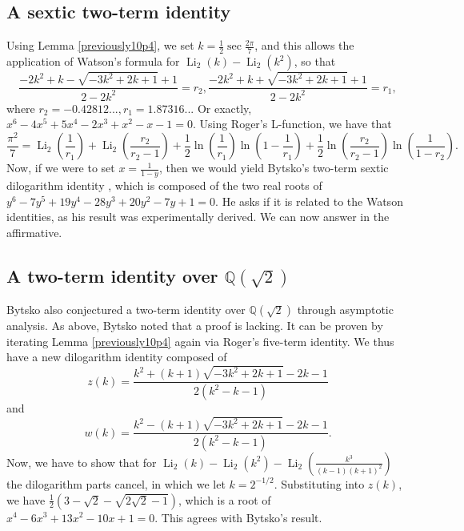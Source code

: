 \documentclass[12pt]{article}
\begin{document}
\subsection{A sextic two-term identity}
 Using Lemma \ref{previously10p4}, we set $k=\frac{1}{2}\sec \frac{2\pi}{7}$, and this allows the application of Watson's formula 
 for $\operatorname{Li}_2(k) - \operatorname{Li}_2(k^2)$, so that 
\begin{equation*}
 \frac{-2k^2 + k - \sqrt{-3k^2 + 2k + 1} + 1}{2 - 2k^2}=r_2, \frac{-2k^2 + k + \sqrt{-3k^2 + 2k + 1} + 1}{2 - 2k^2}=r_1, 
\end{equation*}
 where $r_2 = -0.42812..., r_1=1.87316...$ Or exactly, $x^6 - 4 x^5 + 5 x^4 - 2 x^3 + x^2 - x - 1 =0$. 
 Using Roger's L-function, we have that 
\begin{equation*}
\frac{\pi^2}{7} = 
 \operatorname{Li}_2\left(\frac{1}{r_1}\right) + \operatorname{Li}_2\left(\frac{r_2}{r_2 - 1}\right) + 
 \frac{1}{2} \ln\left(\frac{1}{r_1}\right) \ln\left(1 - \frac{1}{r_1}\right) + \frac{1}{2} \ln\left(\frac{r_2}{r_2 - 
 1}\right) \ln\left(\frac{1}{1 - r_2}\right). 
\end{equation*}
 Now, if we were to set $x = \frac{1}{1-y}$, then we would yield Bytsko's two-term sextic dilogarithm identity \cite{Bytsko1999}, 
 which is composed of the two real roots of $y^6 - 7 y^5 + 19 y^4 - 28 y^3 + 20 y^2 - 7 y + 1=0$. He asks if it is 
 related to the Watson identities, as his result was experimentally derived. We can now answer in the affirmative.

\subsection{A two-term identity over $\mathbb{Q}(\sqrt{2})$}
 Bytsko \cite{Bytsko1999} also conjectured a two-term identity over $\mathbb{Q}(\sqrt{2})$ through asymptotic analysis. As 
 above, Bytsko noted that a proof is lacking. It can be proven by iterating Lemma \ref{previously10p4} again via Roger's 
 five-term identity. We thus have a new dilogarithm identity composed of $$ z(k) = \frac{k^2 + (k + 1) \sqrt{-3k^2 + 2k + 1} - 
 2k - 1}{2(k^2 - k - 1)} $$ and $$ w(k) = \frac{k^2 - (k + 1) \sqrt{-3k^2 + 2k + 1} - 2k - 1}{2(k^2 - k - 1)}. $$ Now, we have to 
 show that for $\operatorname{Li}_2(k) - \operatorname{Li}_2(k^2) - \operatorname{Li}_2\left( \frac{k^3}{(k - 1)(k + 1)^2} \right)$ the 
 dilogarithm parts cancel, in which we let $k=2^{-1/2}$. Substituting into $z(k)$, we have $\frac{1}{2} \left( 3 - \sqrt{2} - \sqrt{2\sqrt{2} - 
 1} \right) $, which is a root of $x^4 - 6 x^3 + 13 x^2 - 10 x + 1=0$. This agrees with Bytsko's result. 
\end{document}
